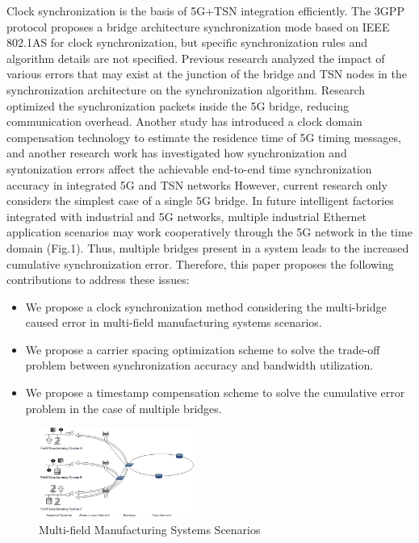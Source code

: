 \documentclass[english]{cccconf}
\begin{document}
Clock synchronization is the basis of 5G+TSN integration efficiently. The 3GPP protocol proposes a bridge architecture synchronization mode based on IEEE 802.1AS for clock synchronization, but specific synchronization rules and algorithm details are not specified\cite{888888}. Previous research analyzed the impact of various errors that may exist at the junction of the bridge and TSN nodes in the synchronization architecture on the synchronization algorithm\cite{9527833}. Research\cite{9211936} optimized the synchronization packets inside the 5G bridge, reducing communication overhead. Another study has introduced a clock domain compensation technology to estimate the residence time of 5G timing messages\cite{9674640}, and another research work has investigated how synchronization and syntonization errors affect the achievable end-to-end time synchronization accuracy in integrated 5G and TSN networks However, current research only considers the simplest case of a single 5G bridge\cite{9557468}. In future intelligent factories integrated with industrial and 5G networks, multiple industrial Ethernet application scenarios may work cooperatively through the 5G network in the time domain\cite{8402373} (Fig.1). Thus, multiple bridges present in a system leads to the increased cumulative synchronization error. Therefore, this paper proposes the following contributions to address these issues:
\begin{itemize}
	\item We propose a clock synchronization method considering the multi-bridge caused error in multi-field manufacturing systems scenarios.
	\item We propose a carrier spacing optimization scheme to solve the trade-off problem between synchronization accuracy and bandwidth utilization.
	\item We propose a timestamp compensation scheme to solve the cumulative error problem in the case of multiple bridges.

\end{itemize}
\begin{figure}[htbp]
	\centering
	\setcounter{figure}{0}
	\includegraphics[width=2in]{fig11.png}
	\caption{Multi-field Manufacturing Systems Scenarios}
\end{figure}
\end{document}
